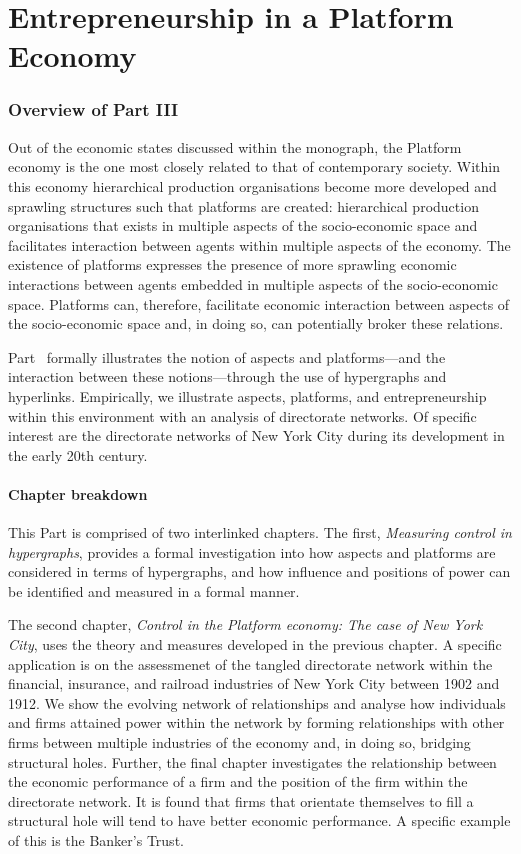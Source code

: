 \part{Entrepreneurship in a Platform Economy} 
\label{part:entrepreneurshipPlatformEconomy}

\section*{Overview of Part III}

Out of the economic states discussed within the monograph, the Platform economy is the one most closely related to that of contemporary society. Within this economy hierarchical production organisations become more developed and sprawling structures such that platforms are created: hierarchical production organisations that exists in multiple aspects of the socio-economic space and facilitates interaction between agents within multiple aspects of the economy. The existence of platforms expresses the presence of more sprawling economic interactions between agents embedded in multiple aspects of the socio-economic space. Platforms can, therefore, facilitate economic interaction between aspects of the socio-economic space and, in doing so, can potentially broker these relations.

Part~\ref{part:entrepreneurshipPlatformEconomy} formally illustrates the notion of aspects and platforms---and the interaction between these notions---through the use of hypergraphs and hyperlinks. Empirically, we illustrate aspects, platforms, and entrepreneurship within this environment with an analysis of directorate networks. Of specific interest are the directorate networks of New York City during its development in the early 20th century.

\subsection*{Chapter breakdown}

This Part is comprised of two interlinked chapters. The first, \emph{Measuring control in hypergraphs}, provides a formal investigation into how aspects and platforms are considered in terms of hypergraphs, and how influence and positions of power can be identified and measured in a formal manner.

The second chapter, \emph{Control in the Platform economy: The case of New York City}, uses the theory and measures developed in the previous chapter. A specific application is on the assessmenet of the tangled directorate network within the financial, insurance, and railroad industries of New York City between 1902 and 1912. We show the evolving network of relationships and analyse how individuals and firms attained power within the network by forming relationships with other firms between multiple industries of the economy and, in doing so, bridging structural holes. Further, the final chapter investigates the relationship between the economic performance of a firm and the position of the firm within the directorate network. It is found that firms that orientate themselves to fill a structural hole will tend to have better economic performance. A specific example of this is the Banker's Trust.